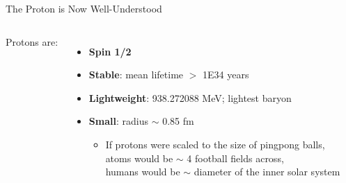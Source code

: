 \documentclass[aspectratio=169]{beamer}
\newcommand*{\myfont}{\fontfamily{lmtt}\selectfont}
\begin{document}
\begin{frame}{The Proton is Now Well-Understood}
   \begin{columns}
        Protons are:
              \begin{itemize}
                    \setlength\itemsep{1em}
                    \item \textbf{Spin 1/2}
                    \item \textbf{Stable}: mean lifetime $>$ 1E34 years 
                    \item \textbf{Lightweight}: 938.272088 MeV; lightest baryon\\
                     {\myfont{\tiny  [n.b. 1 eV = 1.8E-36 kg]   }}
                    \item \textbf{Small}: radius $\sim$ 0.85 fm\\
                         \begin{itemize}
                            \item If protons were scaled to the size of pingpong balls,\\
                            atoms would be $\sim$ 4 football fields across,\\
                            humans would be $\sim$ diameter of the inner solar system
                        \end{itemize}
                    \end{itemize}
                    

\end{columns}
\end{frame}
\end{document}
